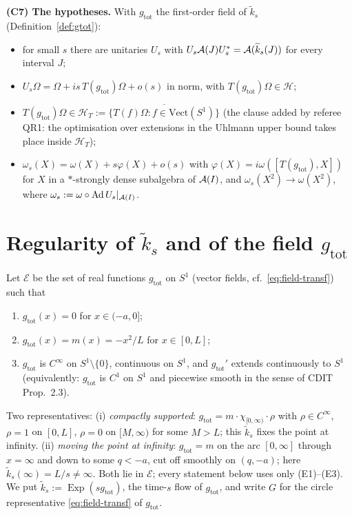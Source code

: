 \documentclass[11pt]{article}
\newcommand{\Om}{\Omega}
\newcommand{\Hil}{\mathcal H}
\newcommand{\Vect}{\mathrm{Vect}}
\newcommand{\gtot}{g_{\mathrm{tot}}}
\newcommand{\ktil}{\widetilde k}
\newcommand{\Ad}{\operatorname{Ad}}
\newcommand{\Exp}{\operatorname{Exp}}
\begin{document}
\textbf{(C7) The hypotheses.}  With $\gtot$ the first-order field of $\ktil_s$ (Definition~\ref{def:gtot}):
\begin{itemize}[leftmargin=1.3em]
\item[(H1)] for small $s$ there are unitaries $U_s$ with $U_s\cA(J)U_s^*=\cA(\ktil_s(J))$ for every interval $J$;
\item[(H2)] $U_s\Om=\Om+is\,T(\gtot)\Om+o(s)$ in norm, with $T(\gtot)\Om\in\Hil$;
\item[(H2$'$)] $T(\gtot)\Om\in\Hil_T:=\overline{\{T(f)\Om:f\in\Vect(S^1)\}}$ (the clause added by referee QR1:
the optimisation over extensions in the Uhlmann upper bound takes place inside $\Hil_T$);
\item[(H3)] $\omega_s(X)=\omega(X)+s\varphi(X)+o(s)$ with $\varphi(X)=i\omega([T(\gtot),X])$ for $X$ in a
$*$-strongly dense subalgebra of $\mathcal A(I)$, and $\omega_s(X^2)\to\omega(X^2)$, where $\omega_s:=\omega\circ\Ad U_s|_{\cA(I)}$.
\end{itemize}

\section{Regularity of $\ktil_s$ and of the field $\gtot$}\label{sec:reg}

\begin{definition}\label{def:gtot}
Let $\mathcal E$ be the set of real functions $\gtot$ on $S^1$ (vector fields, cf.\ \eqref{eq:field-transf}) such that
\begin{enumerate}[leftmargin=2.2em,label=\textup{(E\arabic*)}]
\item $\gtot(x)=0$ for $x\in(-a,0]$;
\item $\gtot(x)=m(x)=-x^2/L$ for $x\in[0,L]$;
\item $\gtot$ is $C^\infty$ on $S^1\setminus\{0\}$, continuous on $S^1$, and $\gtot'$ extends continuously to $S^1$
      (equivalently: $\gtot$ is $C^1$ on $S^1$ and piecewise smooth in the sense of CDIT Prop.~2.3).
\end{enumerate}
Two representatives:
\textup{(i)} \emph{compactly supported}: $\gtot=m\cdot\chi_{[0,\infty)}\cdot\rho$ with $\rho\in C^\infty$, $\rho=1$ on $[0,L]$,
$\rho=0$ on $[M,\infty)$ for some $M>L$; this $\ktil_s$ fixes the point at infinity.
\textup{(ii)} \emph{moving the point at infinity}: $\gtot=m$ on the arc $[0,\infty]$ through $x=\infty$ and down to some
$q<-a$, cut off smoothly on $(q,-a)$; here $\ktil_s(\infty)=L/s\ne\infty$.
Both lie in $\mathcal E$; every statement below uses only \textup{(E1)--(E3)}.  We put $\ktil_s:=\Exp(s\gtot)$,
the time-$s$ flow of $\gtot$, and write $G$ for the circle representative \eqref{eq:field-transf} of $\gtot$.
\end{definition}
\end{document}
